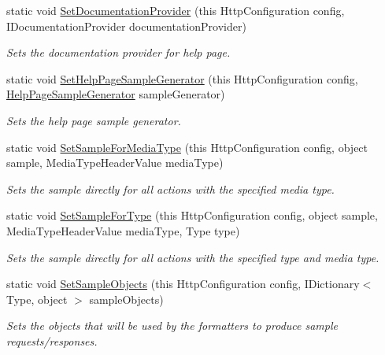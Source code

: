 \begin{DoxyCompactItemize}
static void \hyperlink{classApi3Layers_1_1Areas_1_1HelpPage_1_1HelpPageConfigurationExtensions_af10aae8f181e9989cbf3183a7dd297c7}{Set\+Documentation\+Provider} (this Http\+Configuration config, I\+Documentation\+Provider documentation\+Provider)
\begin{DoxyCompactList}\small\item\em Sets the documentation provider for help page. \end{DoxyCompactList}\item 
static void \hyperlink{classApi3Layers_1_1Areas_1_1HelpPage_1_1HelpPageConfigurationExtensions_a4788b1a5481baebf9302bad07fa4d784}{Set\+Help\+Page\+Sample\+Generator} (this Http\+Configuration config, \hyperlink{classApi3Layers_1_1Areas_1_1HelpPage_1_1HelpPageSampleGenerator}{Help\+Page\+Sample\+Generator} sample\+Generator)
\begin{DoxyCompactList}\small\item\em Sets the help page sample generator. \end{DoxyCompactList}\item 
static void \hyperlink{classApi3Layers_1_1Areas_1_1HelpPage_1_1HelpPageConfigurationExtensions_af6ec1b6adfbeb0c61221bb7eeed98c8e}{Set\+Sample\+For\+Media\+Type} (this Http\+Configuration config, object sample, Media\+Type\+Header\+Value media\+Type)
\begin{DoxyCompactList}\small\item\em Sets the sample directly for all actions with the specified media type. \end{DoxyCompactList}\item 
static void \hyperlink{classApi3Layers_1_1Areas_1_1HelpPage_1_1HelpPageConfigurationExtensions_ac4e9d3ce5bc78349ee756b5eae07718a}{Set\+Sample\+For\+Type} (this Http\+Configuration config, object sample, Media\+Type\+Header\+Value media\+Type, Type type)
\begin{DoxyCompactList}\small\item\em Sets the sample directly for all actions with the specified type and media type. \end{DoxyCompactList}\item 
static void \hyperlink{classApi3Layers_1_1Areas_1_1HelpPage_1_1HelpPageConfigurationExtensions_a0578ea8446c286c76da516e819fe253c}{Set\+Sample\+Objects} (this Http\+Configuration config, I\+Dictionary$<$ Type, object $>$ sample\+Objects)
\begin{DoxyCompactList}\small\item\em Sets the objects that will be used by the formatters to produce sample requests/responses. \end{DoxyCompactList}\item 

\end{DoxyCompactItemize}

